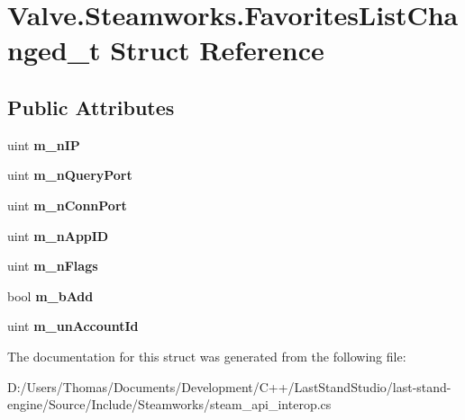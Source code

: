 \hypertarget{structValve_1_1Steamworks_1_1FavoritesListChanged__t}{}\section{Valve.\+Steamworks.\+Favorites\+List\+Changed\+\_\+t Struct Reference}
\label{structValve_1_1Steamworks_1_1FavoritesListChanged__t}
\subsection*{Public Attributes}
\begin{DoxyCompactItemize}
\item 
\hypertarget{structValve_1_1Steamworks_1_1FavoritesListChanged__t_a61ead2ecc668c21870ba3ac2469b29f2}{}uint {\bfseries m\+\_\+n\+I\+P}\label{structValve_1_1Steamworks_1_1FavoritesListChanged__t_a61ead2ecc668c21870ba3ac2469b29f2}

\item 
\hypertarget{structValve_1_1Steamworks_1_1FavoritesListChanged__t_a39f949a54e9c7f0aa3c7fb98715c9ff2}{}uint {\bfseries m\+\_\+n\+Query\+Port}\label{structValve_1_1Steamworks_1_1FavoritesListChanged__t_a39f949a54e9c7f0aa3c7fb98715c9ff2}

\item 
\hypertarget{structValve_1_1Steamworks_1_1FavoritesListChanged__t_a829fac09fde362ca4dfe27692256d86c}{}uint {\bfseries m\+\_\+n\+Conn\+Port}\label{structValve_1_1Steamworks_1_1FavoritesListChanged__t_a829fac09fde362ca4dfe27692256d86c}

\item 
\hypertarget{structValve_1_1Steamworks_1_1FavoritesListChanged__t_a3b5d92cbc915d6f8c82f7adc72ea92be}{}uint {\bfseries m\+\_\+n\+App\+I\+D}\label{structValve_1_1Steamworks_1_1FavoritesListChanged__t_a3b5d92cbc915d6f8c82f7adc72ea92be}

\item 
\hypertarget{structValve_1_1Steamworks_1_1FavoritesListChanged__t_add9d5089afdeebe942fa3a4779b1e8f0}{}uint {\bfseries m\+\_\+n\+Flags}\label{structValve_1_1Steamworks_1_1FavoritesListChanged__t_add9d5089afdeebe942fa3a4779b1e8f0}

\item 
\hypertarget{structValve_1_1Steamworks_1_1FavoritesListChanged__t_a449fb7cc5112e35ca50f56bfab777a7c}{}bool {\bfseries m\+\_\+b\+Add}\label{structValve_1_1Steamworks_1_1FavoritesListChanged__t_a449fb7cc5112e35ca50f56bfab777a7c}

\item 
\hypertarget{structValve_1_1Steamworks_1_1FavoritesListChanged__t_a67a0224f5345b376c6344219781dbf68}{}uint {\bfseries m\+\_\+un\+Account\+Id}\label{structValve_1_1Steamworks_1_1FavoritesListChanged__t_a67a0224f5345b376c6344219781dbf68}

\end{DoxyCompactItemize}


The documentation for this struct was generated from the following file\+:\begin{DoxyCompactItemize}
\item 
D\+:/\+Users/\+Thomas/\+Documents/\+Development/\+C++/\+Last\+Stand\+Studio/last-\/stand-\/engine/\+Source/\+Include/\+Steamworks/steam\+\_\+api\+\_\+interop.\+cs\end{DoxyCompactItemize}
